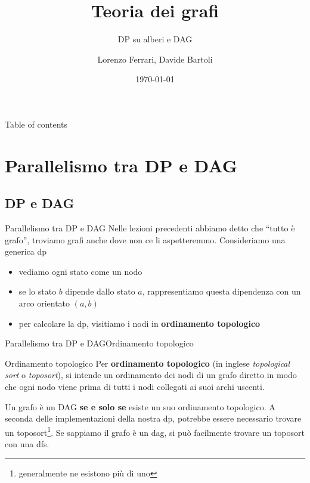 \documentclass[compress]{beamer}
\title{Teoria dei grafi}
\subtitle{DP su alberi e DAG}
\author{Lorenzo Ferrari, Davide Bartoli}
\date{\today}
\begin{document}
\begin{frame}
  \maketitle
\end{frame}

\begin{frame}{Table of contents}
  \tableofcontents
\end{frame}

\section{Parallelismo tra DP e DAG}
\subsection{DP e DAG}
\begin{frame}{Parallelismo tra DP e DAG}
    Nelle lezioni precedenti abbiamo detto che ``tutto \`e grafo'', troviamo grafi anche dove non ce li aspetteremmo.
    \pause
    \vfill
    Consideriamo una generica dp
    \begin{itemize}
        \item vediamo ogni stato come un nodo
        \item se lo stato $b$ dipende dallo stato $a$, rappresentiamo questa dipendenza con un arco orientato $(a, b)$
        \item per calcolare la dp, visitiamo i nodi in \textbf{ordinamento topologico}
    \end{itemize}
\end{frame}

\begin{frame}{Parallelismo tra DP e DAG}{Ordinamento topologico}
    \begin{block}{Ordinamento topologico}
        Per \textbf{ordinamento topologico} (in inglese \textit{topological sort} o \textit{toposort}), si intende un ordinamento dei nodi di un grafo diretto in modo che ogni nodo viene prima di tutti i nodi collegati ai suoi archi uscenti.
    \end{block}
    \pause
    Un grafo \`e un DAG \textbf{se e solo se} esiste un suo ordinamento topologico.
    \vfill
    \pause
    A seconda delle implementazioni della nostra dp, potrebbe essere necessario trovare un toposort\footnote{generalmente ne esistono pi\`u di uno}.
    \pause
    \vfill
    Se sappiamo il grafo \`e un dag, si pu\`o facilmente trovare un toposort con una dfs.


\end{frame}
\end{document}
